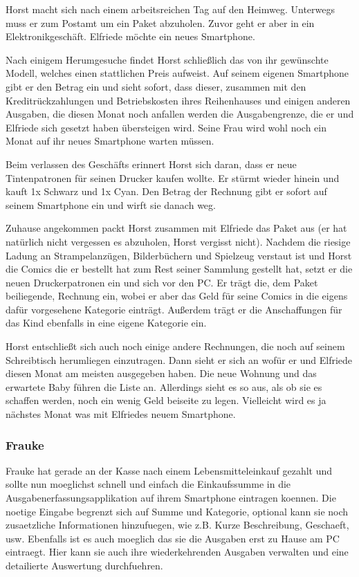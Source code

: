 Horst macht sich nach einem arbeitsreichen Tag auf den Heimweg. Unterwegs muss er zum
Postamt um ein Paket abzuholen. Zuvor geht er aber in ein Elektronikgesch\"aft.
Elfriede m\"ochte ein neues Smartphone.

Nach einigem Herumgesuche findet Horst schlie\ss lich das von ihr gew\"unschte
Modell, welches einen stattlichen Preis aufweist. Auf seinem eigenen
Smartphone gibt er den Betrag ein und sieht sofort, dass dieser, zusammen
mit den Kreditr\"uckzahlungen und Betriebskosten ihres Reihenhauses und
einigen anderen Ausgaben, die diesen Monat noch anfallen werden die
Ausgabengrenze, die er und Elfriede sich gesetzt haben \"ubersteigen wird.
Seine Frau wird wohl noch ein Monat auf ihr neues Smartphone warten
m\"ussen.

Beim verlassen des Gesch\"afts erinnert Horst sich daran, dass er neue
Tintenpatronen für seinen Drucker kaufen wollte. Er st\"urmt wieder hinein
und kauft 1x Schwarz und 1x Cyan. Den Betrag der Rechnung gibt er sofort
auf seinem Smartphone ein und wirft sie danach weg.

Zuhause angekommen packt Horst zusammen mit Elfriede das Paket aus (er hat
nat\"urlich nicht vergessen es abzuholen, Horst vergisst nicht). Nachdem die
riesige Ladung an Strampelanz\"ugen, Bilderb\"uchern und Spielzeug verstaut
ist und Horst die Comics die er bestellt hat zum Rest seiner Sammlung
gestellt hat, setzt er die neuen Druckerpatronen ein und sich vor den PC.
Er tr\"agt die, dem Paket beiliegende, Rechnung ein, wobei er aber das Geld
für seine Comics in die eigens daf\"ur vorgesehene Kategorie eintr\"agt.
Au\ss erdem tr\"agt er die Anschaffungen für das Kind ebenfalls in eine eigene
Kategorie ein.

Horst entschlie\ss t sich auch noch einige andere Rechnungen, die noch auf
seinem Schreibtisch herumliegen einzutragen. Dann sieht er sich an wof\"ur er
und Elfriede diesen Monat am meisten ausgegeben haben. Die neue Wohnung und
das erwartete Baby f\"uhren die Liste an. Allerdings sieht es so aus, als ob
sie es schaffen werden, noch ein wenig Geld beiseite zu legen. Vielleicht
wird es ja n\"achstes Monat was mit Elfriedes neuem Smartphone.

\subsubsection{Frauke}

Frauke hat gerade an der Kasse nach einem Lebensmitteleinkauf gezahlt und
sollte nun moeglichst schnell und einfach die Einkaufssumme in die
Ausgabenerfassungsapplikation auf ihrem Smartphone eintragen koennen. Die 
noetige Eingabe begrenzt sich auf Summe und Kategorie, optional kann sie noch 
zusaetzliche Informationen hinzufuegen, wie z.B. Kurze Beschreibung, Geschaeft, 
usw. Ebenfalls ist es auch moeglich das sie die Ausgaben erst zu Hause am PC 
eintraegt. Hier kann sie auch ihre wiederkehrenden Ausgaben verwalten und eine 
detailierte Auswertung durchfuehren.
